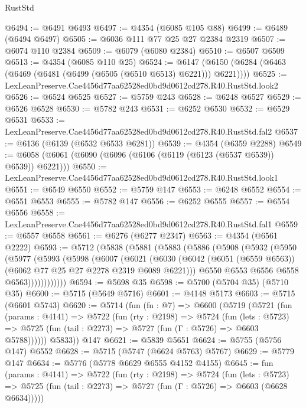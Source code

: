 \begin{lexlean}{RustStd}
\begin{coremodule}
@6494 := @6491 @6493
@6497 := @4354 (@6085 @105 @88)
@6499 := @6489 (@6494 @6497)
@6505 := @6036 @111 @77 @25 @27 @2384 @2319
@6507 := @6074 @110 @2384
@6509 := @6079 (@6080 @2384)
@6510 := @6507 @6509
@6513 := @4354 (@6085 @110 @25)
@6524 := @6147 (@6150 (@6284 (@6463 (@6469 (@6481 (@6499 (@6505 (@6510 @6513) @6221))) @6221))))
@6525 := LexLeanPreserve.Cae4456d77aa62528ed0bd9d0612cd278.R40.RustStd.look2
@6526 := @6524 @6525
@6527 := @5759 @243
@6528 := @6248 @6527
@6529 := @6526 @6528
@6530 := @5782 @243
@6531 := @6252 @6530
@6532 := @6529 @6531
@6533 := LexLeanPreserve.Cae4456d77aa62528ed0bd9d0612cd278.R40.RustStd.fal2
@6537 := @6136 (@6139 (@6532 @6533 @6281))
@6539 := @4354 (@6359 @2288)
@6549 := @6058 (@6061 (@6090 (@6096 (@6106 (@6119 (@6123 (@6537 @6539)) @6539)) @6221)))
@6550 := LexLeanPreserve.Cae4456d77aa62528ed0bd9d0612cd278.R40.RustStd.look1
@6551 := @6549 @6550
@6552 := @5759 @147
@6553 := @6248 @6552
@6554 := @6551 @6553
@6555 := @5782 @147
@6556 := @6252 @6555
@6557 := @6554 @6556
@6558 := LexLeanPreserve.Cae4456d77aa62528ed0bd9d0612cd278.R40.RustStd.fal1
@6559 := @6557 @6558
@6561 := @6276 (@6277 @2347)
@6563 := @4354 (@6561 @2222)
@6593 := @5712
    (@5838
      (@5881
        (@5883
          (@5886
            (@5908
              (@5932
                (@5950
                  (@5977
                    (@5993
                      (@5998
                        (@6007
                          (@6021
                            (@6030
                              (@6042
                                (@6051 (@6559 @6563))
                                (@6062 @77 @25 @27 @2278 @2319 @6089 @6221)))
                            @6550
                            @6553
                            @6556
                            @6558
                            @6563))))))))))))
@6594 := @5698 @35
@6598 := @5700 (@5704 @35) (@5710 @35)
@6600 := @5715 (@5649 @5716)
@6601 := @4148 @5173
@6603 := @5715 (@6601 @5743)
@6620 := @5714
    (fun (fn : @7) =>
    @6600
      (@5719
        (@5721
          (fun (params : @4141) =>
          @5722
            (fun (rty : @2198) =>
            @5724
              (fun (lets : @5723) =>
              @5725 (fun (tail : @2273) => @5727 (fun (Γ : @5726) => @6603 @5788))))))
        @5833))
    @147
@6621 := @5839 @5651
@6624 := @5755 (@5756 @147) @6552
@6628 := @5715 (@5747 (@6624 @5763) @5767)
@6629 := @5779 @147
@6634 := @5776 (@5778 @6629 @6555 @4152 @4155)
@6645 := fun (params : @4141) =>
  @5722
    (fun (rty : @2198) =>
    @5724
      (fun (lets : @5723) =>
      @5725 (fun (tail : @2273) => @5727 (fun (Γ : @5726) => @6603 (@6628 @6634)))))

\end{coremodule}
\end{lexlean}
